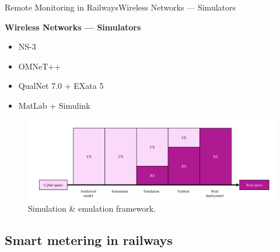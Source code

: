 \begin{frame}{Remote Monitoring in Railways}{Wireless Networks --- Simulators}
\begin{block}{\textbf{Wireless Networks --- Simulators}}
	
	\begin{minipage}[t]{0.48\linewidth}
		\begin{itemize}
			\item NS-3
			\item OMNeT++
			\item QualNet 7.0 + EXata 5
			\item MatLab + Simulink
		\end{itemize}
	\end{minipage}\hfill
	\begin{minipage}[t]{0.48\linewidth}
		
		\begin{figure}[ht!]
			\centering
			\includegraphics[width=1\textwidth,keepaspectratio]{figures/33.WirelessN/simul_VS_emul}
			\caption{Simulation \& emulation framework.}
		\end{figure}
	
	\end{minipage}
	
	
	
\end{block}
\end{frame}


\subsection{Smart metering in railways}


